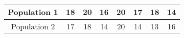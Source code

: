 \begin{tabular}[12pt]{ |c| c| c| c| c| c| c| c|}
    \hline
    Population 1 & 18 & 20 & 16 & 20 & 17 & 18 & 14 \\ 
    \hline
    Population 2 & 17 & 18 & 14 & 20 & 14 & 13 & 16 \\
    \hline 
    \end{tabular}

